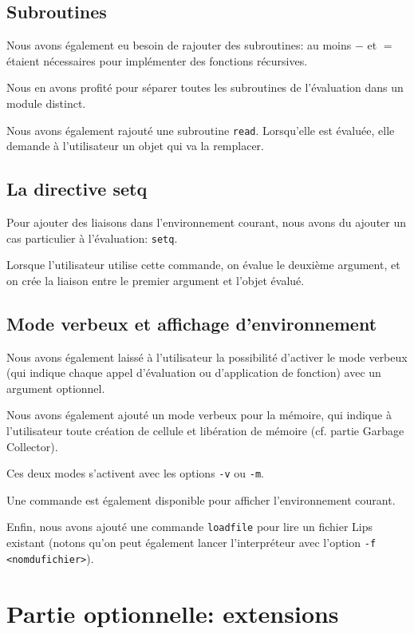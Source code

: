 \documentclass[12pt]{article}
\def\code #1{\lstinline{#1}}
\begin{document}
\subsection{Subroutines}

Nous avons également eu besoin de rajouter des subroutines: au moins $-$ et $=$ étaient nécessaires pour implémenter des fonctions récursives.

Nous en avons profité pour séparer toutes les subroutines de l'évaluation dans un module distinct.

Nous avons également rajouté une subroutine \code{read}. Lorsqu'elle est évaluée, elle demande à l'utilisateur un objet qui va la remplacer.

\subsection{La directive setq}

Pour ajouter des liaisons dans l'environnement courant, nous avons du ajouter un cas particulier à l'évaluation: \code{setq}. 

Lorsque l'utilisateur utilise cette commande, on évalue le deuxième argument, et on crée la liaison entre le premier argument et l'objet évalué.


\subsection{Mode verbeux et affichage d'environnement}

Nous avons également laissé à l'utilisateur la possibilité d'activer le mode verbeux (qui indique chaque appel d'évaluation ou d'application de fonction) avec un argument optionnel.

Nous avons également ajouté un mode verbeux pour la mémoire, qui indique à l'utilisateur toute création de cellule et libération de mémoire (cf. partie Garbage Collector).

Ces deux modes s'activent avec les options \code{-v} ou \code{-m}.

Une commande est également disponible pour afficher l'environnement courant.

Enfin, nous avons ajouté une commande \code{loadfile} pour lire un fichier Lips existant (notons qu'on peut également lancer l'interpréteur avec l'option \code{-f <nomdufichier>}).


\section{Partie optionnelle: extensions}
\end{document}
